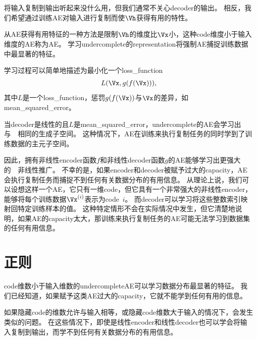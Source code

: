 
\section{}
\label{sec:undercomplete_autoencoders}
将输入复制到输出听起来没什么用，但我们通常不关心\gls{decoder}的输出。
相反，我们希望通过训练\gls{AE}对输入进行复制而使$\Vh$获得有用的特性。


从\gls{AE}获得有用特征的一种方法是限制$\Vh$的维度比$\Vx$小，这种\gls{code}维度小于输入维度的\gls{AE}称为\gls{AE}。
学习\gls{undercomplete}的\gls{representation}将强制\gls{AE}捕捉训练数据中最显著的特征。


学习过程可以简单地描述为最小化一个\gls{loss_function} 
\begin{align}
    L(\Vx, g(f(\Vx))),
\end{align}
其中$L$是一个\gls{loss_function}，惩罚$g(f(\Vx))$与$\Vx$的差异，如\gls{mean_squared_error}。


当\gls{decoder}是线性的且$L$是\gls{mean_squared_error}，\gls{undercomplete}的\gls{AE}会学习出与~~相同的生成子空间。
这种情况下，\gls{AE}在训练来执行复制任务的同时学到了训练数据的主元子空间。


因此，拥有非线性\gls{encoder}函数$f$和非线性\gls{decoder}函数$g$的\gls{AE}能够学习出更强大的~~非线性推广。
不幸的是，如果\gls{encoder}和\gls{decoder}被赋予过大的\gls{capacity}，\gls{AE}会执行复制任务而捕捉不到任何有关数据分布的有用信息。
从理论上说，我们可以设想这样一个\gls{AE}，它只有一维\gls{code}，但它具有一个非常强大的非线性\gls{encoder}，能够将每个训练数据$\Vx^{(i)}$表示为\gls{code}~$i$。
而\gls{decoder}可以学习将这些整数索引映射回特定训练样本的值。
这种特定情形不会在实际情况中发生，但它清楚地说明，如果\gls{AE}的\gls{capacity}太大，那训练来执行复制任务的\gls{AE}可能无法学习到数据集的任何有用信息。


\section{正则}
\label{sec:regularized_autoencoders}
\gls{code}维数小于输入维数的\gls{undercomplete}\gls{AE}可以学习数据分布最显著的特征。
我们已经知道，如果赋予这类\gls{AE}过大的\gls{capacity}，它就不能学到任何有用的信息。


如果隐藏\gls{code}的维数允许与输入相等，或隐藏\gls{code}维数大于输入的情况下，会发生类似的问题。
在这些情况下，即使是线性\gls{encoder}和线性\gls{decoder}也可以学会将输入复制到输出，而学不到任何有关数据分布的有用信息。



